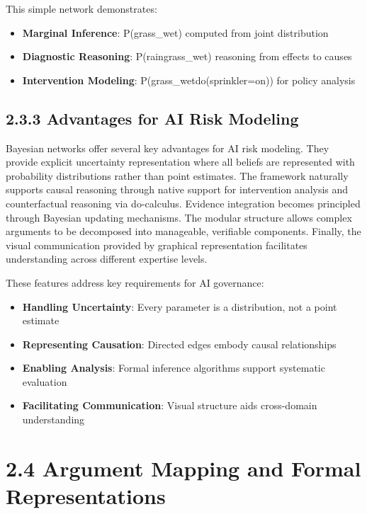\documentclass[
  11pt,
  letterpaper,
]{book}
\providecommand{\tightlist}{%
  \setlength{\itemsep}{0pt}\setlength{\parskip}{0pt}}
\begin{document}
This simple network demonstrates:

\begin{itemize}
\tightlist
\item
  \textbf{Marginal Inference}: P(grass\_wet) computed from joint
  distribution
\item
  \textbf{Diagnostic Reasoning}: P(rain\textbar grass\_wet) reasoning
  from effects to causes
\item
  \textbf{Intervention Modeling}: P(grass\_wet\textbar do(sprinkler=on))
  for policy analysis
\end{itemize}

\subsection*{2.3.3 Advantages for AI Risk
Modeling}\label{sec-modeling-advantages}

Bayesian networks offer several key advantages for AI risk modeling.
They provide explicit uncertainty representation where all beliefs are
represented with probability distributions rather than point estimates.
The framework naturally supports causal reasoning through native support
for intervention analysis and counterfactual reasoning via do-calculus.
Evidence integration becomes principled through Bayesian updating
mechanisms. The modular structure allows complex arguments to be
decomposed into manageable, verifiable components. Finally, the visual
communication provided by graphical representation facilitates
understanding across different expertise levels.

These features address key requirements for AI governance:

\begin{itemize}
\tightlist
\item
  \textbf{Handling Uncertainty}: Every parameter is a distribution, not
  a point estimate
\item
  \textbf{Representing Causation}: Directed edges embody causal
  relationships
\item
  \textbf{Enabling Analysis}: Formal inference algorithms support
  systematic evaluation
\item
  \textbf{Facilitating Communication}: Visual structure aids
  cross-domain understanding
\end{itemize}

\section*{2.4 Argument Mapping and Formal
Representations}\label{sec-argument-mapping}
\end{document}
